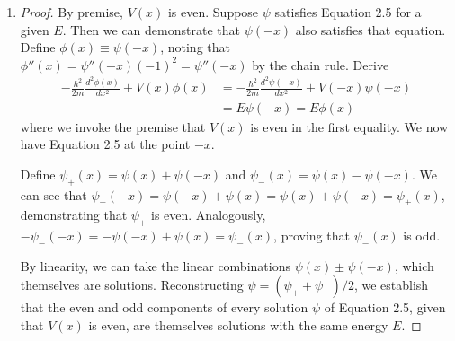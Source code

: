 \documentclass[a4paper]{article}
\begin{document}
\begin{enumerate}[label=(\alph*)]
\begin{proof}[Proof]
\begin{align*}
								     & = E \!\left[ a \!\left( x \right) + ib \!\left( x \right) \right] \\
								     & = E \psi
	\end{align*}
	Now, for the \textbf{same} \( E \) and \( V \) (which in the former case is real by part (a), and in the latter, assumed real throughout the text), \( a \!\left( x \right) \) and \( b \!\left( x \right) \) are both real solutions: \( V \) real guarantees the terms in the parentheses are real, and \( E \) real guarantees \( Ea \) and \( Eb \) are real. Then 
	\[
		-\frac{\hbar^{2}}{2m}\frac{d^2 a}{d x^2} + Va = Ea 
	\]
	and similarly for \( b \!\left( x \right) \). Thus \( \psi \) is itself a linear combination of two real solutions with the same energy \( E \).
	\end{proof}
	\item \begin{proof}[Proof]
	By premise, \( V \!\left( x \right) \) is even. Suppose \( \psi \) satisfies Equation 2.5 for a given \( E \). Then we can demonstrate that \( \psi \!\left( -x \right) \) also satisfies that equation. Define \( \phi \!\left( x \right) \equiv \psi \!\left( -x \right) \), noting that \( \phi''\!\left( x \right) = \psi''\!\left( -x \right)\!\left( -1 \right)^{2} = \psi''\!\left( -x \right) \) by the chain rule. Derive
	\begin{align*}
		-\frac{\hbar^{2}}{2m}\frac{d^2 \phi \!\left( x \right)}{d x^2} + V \!\left( x \right) \phi \!\left( x \right) & = -\frac{\hbar^{2}}{2m}\frac{d^2 \psi \!\left( -x \right)}{d x^2} + V \!\left( -x \right)\psi \!\left( -x \right) \\
															      & = E \psi \!\left( -x \right) = E \phi \!\left( x \right)
	\end{align*}
	where we invoke the premise that \( V \!\left( x \right) \) is even in the first equality. We now have Equation 2.5 at the point \( -x \). 

        Define \( \psi_{+}\!\left( x \right) = \psi \!\left( x \right) + \psi \!\left( -x \right) \) and \( \psi_{-}\!\left( x \right) = \psi \!\left( x \right) - \psi \!\left( -x \right) \). We can see that \( \psi_{+}\!\left( -x \right) = \psi \!\left( -x \right) + \psi \!\left( x \right) = \psi \!\left( x \right) + \psi \!\left( -x \right) = \psi_{+} \!\left( x \right) \), demonstrating that \( \psi_{+} \) is even. Analogously, \( -\psi_{-}\!\left( -x \right) = -\psi \!\left( -x \right) + \psi \!\left( x \right) = \psi_{-}\!\left( x \right) \), proving that \( \psi_{-}\!\left( x \right) \) is odd. 

	By linearity, we can take the linear combinations \( \psi \!\left( x \right) \pm \psi \!\left( -x \right) \), which themselves are solutions. Reconstructing \( \psi = \!\left( \psi_{+} + \psi_{-} \right) / 2 \), we establish that the even and odd components of every solution \( \psi \) of Equation 2.5, given that \( V \!\left( x \right) \) is even, are themselves solutions with the same energy \( E \).
	\end{proof}
\end{enumerate}
\end{document}
